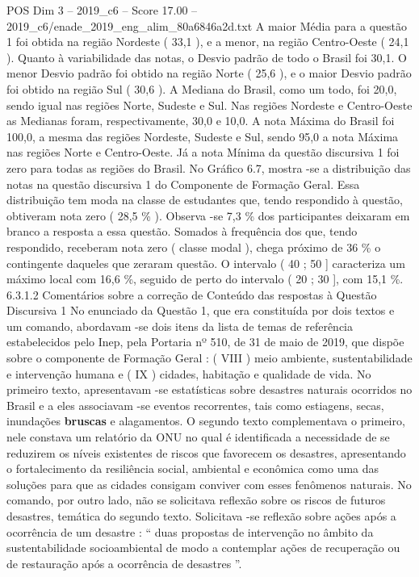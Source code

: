 \begin{textsample}{POS Dim 3 – 2019\_c6 – Score 17.00 – 2019\_c6/enade\_2019\_eng\_alim\_80a6846a2d.txt}
A maior Média para a questão 1 foi obtida na região Nordeste ( 33,1 ), e a menor, na região Centro-Oeste ( 24,1 ).
Quanto à variabilidade das notas, o Desvio padrão de todo o Brasil foi 30,1.
O menor Desvio padrão foi obtido na região Norte ( 25,6 ), e o maior Desvio padrão foi obtido na região Sul ( 30,6 ).
A Mediana do Brasil, como um todo, foi 20,0, sendo igual nas regiões Norte, Sudeste e Sul.
Nas regiões Nordeste e Centro-Oeste as Medianas foram, respectivamente, 30,0 e 10,0.
A nota Máxima do Brasil foi 100,0, a mesma das regiões Nordeste, Sudeste e Sul, sendo 95,0 a nota Máxima nas regiões Norte e Centro-Oeste.
Já a nota Mínima da questão discursiva 1 foi zero para todas as regiões do Brasil.
No Gráfico 6.7, mostra -se a distribuição das notas na questão discursiva 1 do Componente de Formação Geral.
Essa distribuição tem moda na classe de estudantes que, tendo respondido à questão, obtiveram nota zero ( 28,5 \% ).
Observa -se 7,3 \% dos participantes deixaram em branco a resposta a essa questão.
Somados à frequência dos que, tendo respondido, receberam nota zero ( classe modal ), chega próximo de 36 \% o contingente daqueles que zeraram questão.
O intervalo ( 40 ; 50 ] caracteriza um máximo local com 16,6 \%, seguido de perto do intervalo ( 20 ; 30 ], com 15,1 \%. 6.3.1.2 Comentários sobre a correção de Conteúdo das respostas à Questão Discursiva 1 No enunciado da Questão 1, que era constituída por dois textos e um comando, abordavam -se dois itens da lista de temas de referência estabelecidos pelo Inep, pela Portaria nº 510, de 31 de maio de 2019, que dispõe sobre o componente de Formação Geral : ( VIII ) meio ambiente, sustentabilidade e intervenção humana e ( IX ) cidades, habitação e qualidade de vida.
No primeiro texto, apresentavam -se estatísticas sobre desastres naturais ocorridos no Brasil e a eles associavam -se eventos recorrentes, tais como estiagens, secas, inundações \textbf{bruscas} e alagamentos.
O segundo texto complementava o primeiro, nele constava um relatório da ONU no qual é identificada a necessidade de se reduzirem os níveis existentes de riscos que favorecem os desastres, apresentando o fortalecimento da resiliência social, ambiental e econômica como uma das soluções para que as cidades consigam conviver com esses fenômenos naturais.
No comando, por outro lado, não se solicitava reflexão sobre os riscos de futuros desastres, temática do segundo texto.
Solicitava -se reflexão sobre ações após a ocorrência de um desastre : “ duas propostas de intervenção no âmbito da sustentabilidade socioambiental de modo a contemplar ações de recuperação ou de restauração após a ocorrência de desastres ”.

\end{textsample}
